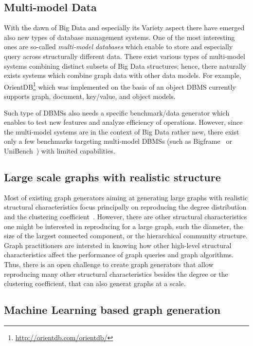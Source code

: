 \subsection{Multi-model Data}
With the dawn of Big Data and especially its Variety aspect there have emerged
also new types of database management systems. One of the most interesting ones
are so-called \emph{multi-model databases} which enable to store and especially
query across structurally different data. There exist various types of
multi-model systems combining  distinct subsets of Big Data structures; hence,
there naturally exists systems which combine graph data with other data models.
For example, OrientDB\footnote{\url{http://orientdb.com/orientdb/}} which was
implemented on the basis of an object DBMS currently supports graph, document,
key/value, and object models.

Such type of DBMSs also needs a specific benchmark/data generator which enables
to test new features and analyze efficiency of operations. However, since the
multi-model systems are in the context of Big Data rather new, there exist only
a few benchmarks targeting multi-model DBMSs (such as
Bigframe~\cite{journals/pvldb/KunjirKB14} or UniBench~\cite{conf/cidr/lu17})
with limited capabilities.

\subsection{Large scale graphs with realistic structure}

Most of existing graph generators aiming at generating large graphs with realistic
structural characteristics focus principally on reproducing the degree
distribution and the clustering
coefficient~\cite{kolda2014scalable,edunov2016darwini}. However, there are other
structural characteristics one might be interested in reproducing for a large
graph, such the diameter, the size of the largest connected component, or the
hierarchical community structure. Graph practitioners are intersted in knowing
how other high-level structural characteristics affect the performance of graph
queries and graph algorithms. Thus, there is an open challenge to create
graph generators that allow reproducing many other structural characteristics
besides the degree or the clustering coefficient, that can also generat graphs
at a scale.


\subsection{Machine Learning based graph generation}

